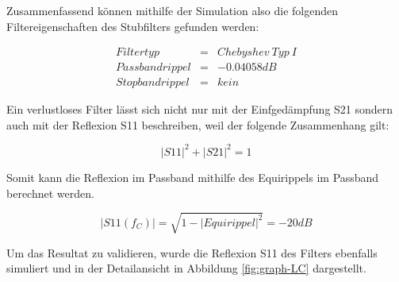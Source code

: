 Zusammenfassend   k\"onnen   mithilfe   der   Simulation  also  die  folgenden
Filtereigenschaften des Stubfilters gefunden werden:

\begin{mdframed}
    \begin{equation*} 
        \begin{array}{rclcl} 
            Filtertyp & = & Chebyshev\ Typ\ I\\
            Passbandrippel & = & -0.04058 dB \\ 
            Stopbandrippel & = & kein 
        \end{array} 
    \end{equation*} 
\end{mdframed}

Ein verlustloses Filter  lässt  sich  nicht  nur  mit  der  Einfgedämpfung S21
sondern auch mit der Reflexion S11 beschreiben, weil der folgende Zusammenhang
gilt:

\begin{equation}
    {|S11|}^2 + {|S21|}^2 = 1
\end{equation}

Somit  kann  die  Reflexion im Passband mithilfe des Equirippels  im  Passband
berechnet werden.

\begin{equation}
    |S11(f_C)| = \sqrt{1-{|Equirippel|}^2} = -20 dB
\end{equation}

Um das Resultat zu validieren, wurde die Reflexion S11  des  Filters ebenfalls
simuliert   und   in  der  Detailansicht   in   Abbildung   \ref{fig:graph-LC}
dargestellt.

